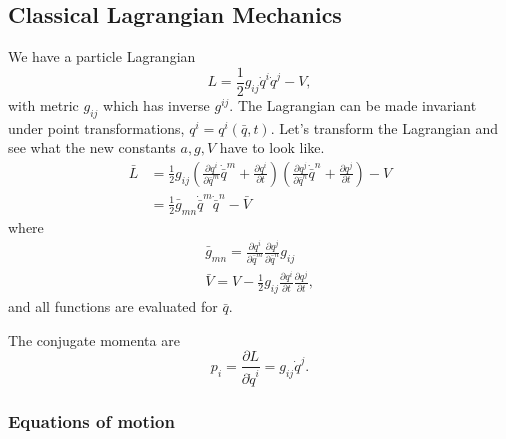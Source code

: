 \subsection{Classical Lagrangian Mechanics}
We have a particle Lagrangian
\begin{equation}
  L= \frac{1}{2}g_{ij}\dot{q}^i\dot{q}^j - V,
\end{equation}
with metric $g_{ij}$ which has inverse $g^{ij}$.  The Lagrangian can be made invariant under point transformations, $q^i=q^i(\bar{q},t)$.  Let's transform the Lagrangian and see what the new constants $a,g,V$ have to look like.  
\begin{align}
\bar{L} &=\frac{1}{2}g_{ij}\left(\frac{\partial q^i}{\partial \bar{q}^m}\dot{\bar{q}}^m+\frac{\partial q^i}{\partial t}\right)\left(\frac{\partial q^j}{\partial \bar{q}^n}\dot{\bar{q}}^n+\frac{\partial q^j}{\partial t}\right)  - V\\
&=\frac{1}{2}\bar{g}_{mn}\dot{\bar{q}}^m\dot{\bar{q}}^n  - \bar{V}
\end{align}
where 
\begin{gather}
\bar{g}_{mn} = \frac{\partial q^i}{\partial\bar{q}^m}\frac{\partial q^j}{\partial\bar{q}^n}g_{ij}\\
\bar{V} = V  - \frac{1}{2}g_{ij}\frac{\partial q^i}{\partial t}\frac{\partial q^j}{\partial t},
\end{gather}
and all functions are evaluated for $\bar{q}$.  

The conjugate momenta are 
\begin{equation}
p_i = \frac{\partial L}{\partial \dot{q}^i} = g_{ij}\dot{q}^j.
\end{equation}

\subsubsection{Equations of motion}

